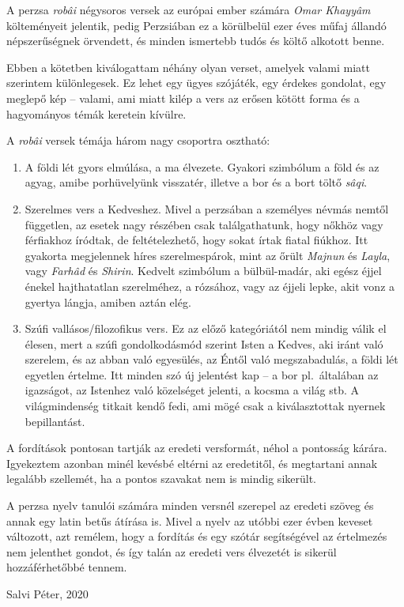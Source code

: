 A perzsa \emph{robâi} négysoros versek az európai ember számára \emph{Omar
Khayyâm} költeményeit jelentik, pedig Perzsiában ez a körülbelül ezer
éves műfaj állandó népszerűségnek örvendett, és minden ismertebb tudós
és költő alkotott benne.

Ebben a kötetben kiválogattam néhány olyan verset, a\-me\-lyek valami
miatt szerintem különlegesek. Ez lehet egy ügyes szójáték, egy érdekes
gondolat, egy meglepő kép -- valami, ami miatt kilép a vers az erősen
kötött forma és a hagyományos témák keretein kívülre.

A \emph{robâi} versek témája három nagy csoportra osztható:

\begin{enumerate}
\item A földi lét gyors elmúlása, a ma élvezete. Gyakori
  szimbólum a föld és az agyag, amibe porhüvelyünk visszatér, illetve
  a bor és a bort töltő \emph{sâqi}.
\item Szerelmes vers a Kedveshez. Mivel a perzsában a személyes névmás
  nemtől független, az esetek nagy részében csak találgathatunk, hogy
  nőkhöz vagy férfiakhoz íródtak, de feltételezhető, hogy sokat írtak
  fiatal fiúkhoz. Itt gyakorta megjelennek híres szerelmespárok, mint
  az őrült \emph{Majnun} és \emph{Layla}, vagy \emph{Farhâd} és
  \emph{Shirin}. Kedvelt szimbólum a bülbül-madár, aki egész éjjel
  énekel hajthatatlan szerelméhez, a rózsához, vagy az éjjeli lepke,
  akit vonz a gyertya lángja, amiben aztán elég.
\item Szúfi vallásos/filozofikus vers. Ez az előző kategóriától nem mindig válik
  el élesen, mert a szúfi gondolkodásmód szerint Isten a Kedves, aki
  iránt való szerelem, és az abban való egyesülés, az Éntől való
  megszabadulás, a földi lét egyetlen értelme. Itt minden szó új
  jelentést kap -- a bor pl.~általában az igazságot, az Istenhez való
  közelséget jelenti, a kocsma a világ stb. A világmindenség titkait
  kendő fedi, ami mögé csak a kiválasztottak nyernek bepillantást.
\end{enumerate}

A fordítások pontosan tartják az eredeti versformát, néhol a pontosság
kárára. Igyekeztem azonban minél kevésbé eltérni az eredetitől, és
megtartani annak legalább szellemét, ha a pontos szavakat nem is
mindig sikerült.

A perzsa nyelv tanulói számára minden versnél szerepel az eredeti
szöveg és annak egy latin betűs átírása is. Mivel a nyelv az utóbbi
ezer évben keveset változott, azt remélem, hogy a fordítás és egy
szótár segítségével az értelmezés nem jelenthet gondot, és így talán
az eredeti vers élvezetét is sikerül hozzáférhetőbbé tennem.

\begin{flushright}
  Salvi Péter, 2020
\end{flushright}
